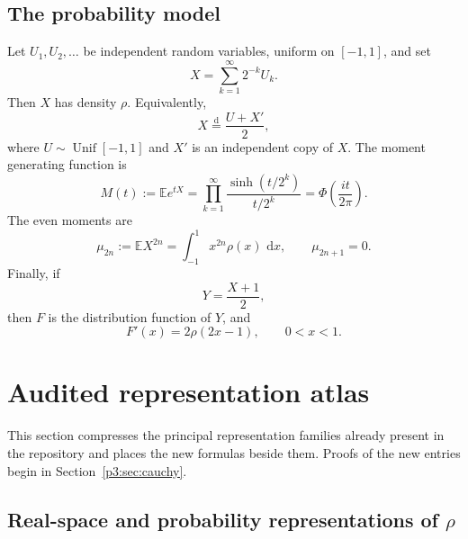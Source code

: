 \documentclass[11pt]{article}
\theoremstyle{definition}
\theoremstyle{remark}
\newcommand{\E}{\mathbb E}
\newcommand{\dd}{\,\mathrm d}
\begin{document}
\subsection{The probability model}

Let \(U_1,U_2,\dots\) be independent random variables, uniform on \([-1,1]\), and set
\begin{equation}
 X=\sum_{k=1}^{\infty}2^{-k}U_k.                              \label{p3:eq:X-series}
\end{equation}
Then \(X\) has density \(\rho\).  Equivalently,
\begin{equation}
 X\overset{\mathrm d}=\frac{U+X'}2,                           \label{p3:eq:X-fixed-point}
\end{equation}
where \(U\sim\operatorname{Unif}[-1,1]\) and \(X'\) is an independent copy of \(X\).
The moment generating function is
\begin{equation}
 M(t):=\E e^{tX}
 =\prod_{k=1}^{\infty}\frac{\sinh(t/2^k)}{t/2^k}
 =\Phi\!\left(\frac{it}{2\pi}\right).                       \label{p3:eq:M-product}
\end{equation}
The even moments are
\begin{equation}
 \mu_{2n}:=\E X^{2n}=\int_{-1}^{1}x^{2n}\rho(x)\,\dd x,
 \qquad \mu_{2n+1}=0.                                      \label{p3:eq:moments}
\end{equation}
Finally, if
\begin{equation}
 Y=\frac{X+1}{2},                                             \label{p3:eq:Y-affine}
\end{equation}
then \(F\) is the distribution function of \(Y\), and
\begin{equation}
 F'(x)=2\rho(2x-1),\qquad 0<x<1.                              \label{p3:eq:F-density}
\end{equation}

\section{Audited representation atlas}

This section compresses the principal representation families already present in the
repository and places the new formulas beside them.  Proofs of the new entries begin in
Section~\ref{p3:sec:cauchy}.

\subsection{Real-space and probability representations of \(\rho\)}
\end{document}
